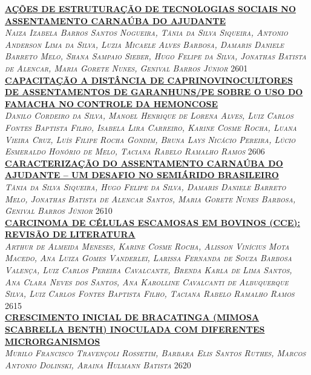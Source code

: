 \noindent \textsc{\hyperlink{trabalhos/251425.pdf.1}{\textbf{AÇÕES DE ESTRUTURAÇÃO DE TECNOLOGIAS SOCIAIS NO ASSENTAMENTO CARNAÚBA DO AJUDANTE}}}\\ 
\noindent \textsc{\textit{Naiza Izabela Barros Santos Nogueira, Tânia da Silva Siqueira, Antonio Anderson Lima da Silva, Luzia Micaele Alves Barbosa, Damaris Daniele Barreto Melo, Shana Sampaio Sieber, Hugo Felipe da Silva, Jonathas Batista de Alencar, Maria Gorete Nunes, Genival Barros Júnior}} \hfill 2601\\ 

\noindent \textsc{\hyperlink{trabalhos/251660.pdf.1}{\textbf{CAPACITAÇÃO A DISTÂNCIA DE CAPRINOVINOCULTORES DE ASSENTAMENTOS DE GARANHUNS/PE SOBRE O USO DO FAMACHA NO CONTROLE DA HEMONCOSE}}}\\ 
\noindent \textsc{\textit{Danilo Cordeiro da Silva, Manoel Henrique de Lorena Alves, Luiz Carlos Fontes Baptista Filho, Isabela Lira Carreiro, Karine Cosme Rocha, Luana Vieira Cruz, Luís Filipe Rocha Gondim, Bruna Lays Nicácio Pereira, Lúcio Esmeraldo Honório de Melo, Taciana Rabelo Ramalho Ramos}} \hfill 2606\\ 

\noindent \textsc{\hyperlink{trabalhos/250388.pdf.1}{\textbf{CARACTERIZAÇÃO DO ASSENTAMENTO CARNAÚBA DO AJUDANTE – UM DESAFIO NO SEMIÁRIDO BRASILEIRO}}}\\ 
\noindent \textsc{\textit{Tânia da Silva Siqueira, Hugo Felipe da Silva, Damaris Daniele Barreto Melo, Jonathas Batista de Alencar Santos, Maria Gorete Nunes Barbosa, Genival Barros Júnior}} \hfill 2610\\ 

\noindent \textsc{\hyperlink{trabalhos/249573.pdf.1}{\textbf{CARCINOMA DE CÉLULAS ESCAMOSAS EM BOVINOS (CCE): REVISÃO DE LITERATURA}}}\\ 
\noindent \textsc{\textit{Arthur de Almeida Meneses, Karine Cosme Rocha, Alisson Vinícius Mota Macedo, Ana Luiza Gomes Vanderlei, Larissa Fernanda de Souza Barbosa Valença, Luiz Carlos Pereira Cavalcante, Brenda Karla de Lima Santos, Ana Clara Neves dos Santos, Ana Karolline Cavalcanti de Albuquerque Silva, Luiz Carlos Fontes Baptista Filho, Taciana Rabelo Ramalho Ramos}} \hfill 2615\\ 

\noindent \textsc{\hyperlink{trabalhos/250427.pdf.1}{\textbf{CRESCIMENTO INICIAL DE BRACATINGA (MIMOSA SCABRELLA BENTH) INOCULADA COM DIFERENTES MICRORGANISMOS}}}\\ 
\noindent \textsc{\textit{Murilo Francisco Travençoli Rossetim, Barbara Elis Santos Ruthes, Marcos Antonio Dolinski, Araina Hulmann Batista}} \hfill 2620\\ 

